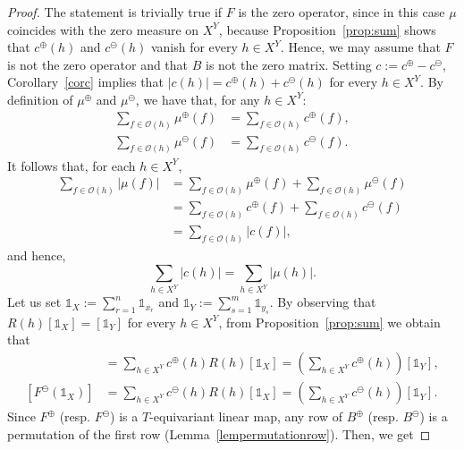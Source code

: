 \documentclass[11pt]{article}
\begin{document}
\begin{proof}
The statement is trivially true if $F$ is the zero operator, since in this case
$\mu$ coincides with the zero measure on $X^Y$, because
Proposition~\ref{prop:sum} shows that $c^\oplus(h)$ and $c^\ominus(h)$ vanish for
every $h \in X^Y$. Hence, we may assume that $F$ is not the zero operator and
that $B$ is not the zero matrix.
Setting $c:= c^\oplus - c^\ominus$, Corollary~\ref{corc} implies that $\lvert c(h) \rvert = c^\oplus(h) + c^\ominus(h)$ for every $h \in X^Y$. By definition of $\mu^\oplus$ and $\mu^\ominus$, we have that, for any $h \in X^Y$:
    \begin{align*}
    \sum_{f \in \mathcal{O}(h)} \mu^\oplus(f) & = \sum_{f \in \mathcal{O}(h)} c^\oplus(f)
    , \\
    \sum_{f \in \mathcal{O}(h)} \mu^\ominus(f) & = \sum_{f \in \mathcal{O}(h)} c^\ominus(f).
    \end{align*}
    It follows that, for each $h \in X^Y$,
    \begin{align*}
    \sum_{f \in \mathcal{O}(h)} \left| \mu(f) \right| & = \sum_{f \in \mathcal{O}(h)} \mu^\oplus(f) + \sum_{f \in \mathcal{O}(h)} \mu^\ominus(f) \\
    & = \sum_{f \in \mathcal{O}(h)} c^\oplus(f) + \sum_{f \in \mathcal{O}(h)} c^\ominus(f) \\
    & = \sum_{f \in \mathcal{O}(h)} \left| c(f) \right|,
    \end{align*}
    and hence,
    \begin{equation}
    \label{eq:negeq}
    \sum_{h \in X^Y} \left| c(h) \right| = \sum_{h \in X^Y} \left| \mu(h) \right|.
    \end{equation}
    Let us set $\mathds{1}_X := \sum_{r=1}^n \mathds{1}_{x_r}$ and $\mathds{1}_Y := \sum_{s=1}^m \mathds{1}_{y_s}$. 
    By observing that 
    $R(h) [\mathds{1}_X]=[\mathds{1}_Y]$ for every $h\in X^Y$, from Proposition~\ref{prop:sum} we obtain that 
    \begin{align*}
[F^\oplus\left(\mathds{1}_X\right)]&=\sum_{h \in X^Y} c^\oplus(h) R(h) [\mathds{1}_X] = \left(\sum_{h \in X^Y}c^\oplus(h)\right) [\mathds{1}_Y],
    \\ [F^\ominus\left(\mathds{1}_X\right)]&=\sum_{h \in X^Y} c^\ominus(h) R(h) [\mathds{1}_X] = \left(\sum_{h \in X^Y}c^\ominus(h)\right) [\mathds{1}_Y].
    \end{align*}
    Since $F^\oplus$ (resp. $F^\ominus$) is a $T$-equivariant linear map, any row of $B^\oplus$ (resp. $B^\ominus$) is a permutation of the first row (Lemma~\ref{lempermutationrow}). Then, we get

\end{proof}
\end{document}

